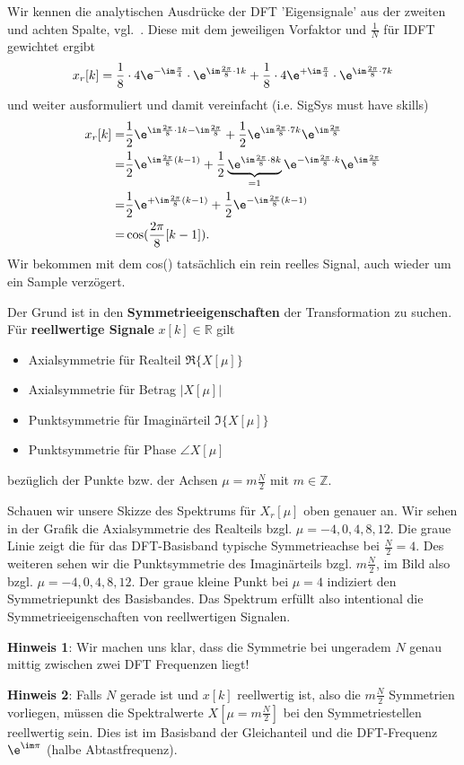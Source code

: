 \begin{ExCalc}
Wir kennen die analytischen Ausdrücke der DFT 'Eigensignale' aus der zweiten
und achten Spalte, vgl.~.
Diese mit dem jeweiligen Vorfaktor und $\frac{1}{N}$ für IDFT gewichtet ergibt
\begin{align}
x_r[k]
=
\frac{1}{8} \cdot 4 \e^{-\im\frac{\pi}{4}} \cdot  \e^{\im \frac{2\pi}{8}\cdot 1 k}+
\frac{1}{8} \cdot 4 \e^{+\im\frac{\pi}{4}} \cdot  \e^{\im \frac{2\pi}{8}\cdot 7 k}
\end{align}
%
und weiter ausformuliert und damit vereinfacht (i.e. SigSys must have skills)
\begin{align}
x_r[k]
=
&\frac{1}{2} \e^{\im \frac{2\pi}{8}\cdot 1 k - \im\frac{2\pi}{8}}+
\frac{1}{2} \e^{\im \frac{2\pi}{8}\cdot 7 k} \e^{\im\frac{2\pi}{8}}\\
=
&\frac{1}{2} \e^{\im \frac{2\pi}{8} (k-1)}+
\frac{1}{2} \underbrace{\e^{\im \frac{2\pi}{8}\cdot 8 k}}_{=1} \e^{- \im \frac{2\pi}{8}\cdot k} \e^{\im\frac{2\pi}{8}}\\
=
&\frac{1}{2} \e^{+\im \frac{2\pi}{8} (k-1)}+
\frac{1}{2} \e^{-\im \frac{2\pi}{8} (k-1)}\\
=
&\cos(\frac{2\pi}{8} [k-1]).
\end{align}
Wir bekommen mit dem cos() tatsächlich ein rein reelles Signal, auch wieder
um ein Sample verzögert.

Der Grund ist in den \textbf{Symmetrieeigenschaften} der Transformation zu
suchen. Für \textbf{reellwertige Signale} $x[k]\in\mathbb{R}$ gilt
\begin{itemize}
  \item Axialsymmetrie für Realteil $\Re\{X[\mu]\}$
  \item Axialsymmetrie für Betrag $|X[\mu]|$
  \item Punktsymmetrie für Imaginärteil $\Im\{X[\mu]\}$
  \item Punktsymmetrie für Phase $\angle X[\mu]$
\end{itemize}
bezüglich der Punkte bzw. der Achsen $\mu = m \frac{N}{2}$ mit $m\in\mathbb{Z}$.

Schauen wir unsere Skizze des Spektrums für $X_r[\mu]$ oben genauer an.
Wir sehen in der Grafik die Axialsymmetrie des Realteils
bzgl. $\mu=-4,0,4,8,12$. Die graue
Linie zeigt die für das DFT-Basisband typische Symmetrieachse bei $\frac{N}{2}=4$.
Des weiteren sehen wir die Punktsymmetrie des Imaginärteils bzgl. $m \frac{N}{2}$,
im Bild also bzgl. $\mu=-4,0,4,8,12$. Der graue kleine Punkt bei $\mu=4$ indiziert
den Symmetriepunkt des Basisbandes.
Das Spektrum erfüllt also intentional
die Symmetrieeigenschaften von reellwertigen Signalen.

\textbf{Hinweis 1}: Wir machen uns klar, dass die Symmetrie bei ungeradem $N$
genau mittig zwischen zwei DFT Frequenzen liegt!

\textbf{Hinweis 2}:
Falls $N$ gerade ist und $x[k]$ reellwertig ist, also die $m \frac{N}{2}$
Symmetrien vorliegen, müssen die Spektralwerte $X[\mu = m \frac{N}{2}]$
bei den Symmetriestellen reellwertig sein.
Dies ist im Basisband der Gleichanteil und die DFT-Frequenz
$\e^{\im\pi}$ (halbe Abtastfrequenz).
\end{ExCalc}





